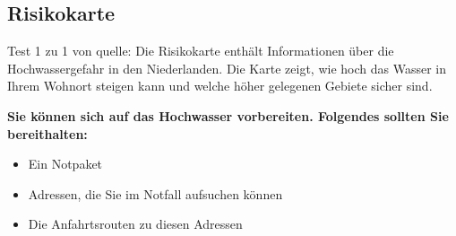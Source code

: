 \subsection{Risikokarte}
Test 1 zu 1 von quelle:
\newline\newline
\textnormal{Die Risikokarte enthält Informationen über die Hochwassergefahr in den Niederlanden. 
Die Karte zeigt, wie hoch das Wasser in Ihrem Wohnort steigen kann und welche höher gelegenen Gebiete sicher sind.
}

\textnormal{\newline\bfseries Sie können sich auf das Hochwasser vorbereiten. 
Folgendes sollten Sie bereithalten:}
 
\begin{itemize}  
\item Ein Notpaket
\item Adressen, die Sie im Notfall aufsuchen können
\item Die Anfahrtsrouten zu diesen Adressen
\end{itemize}  

